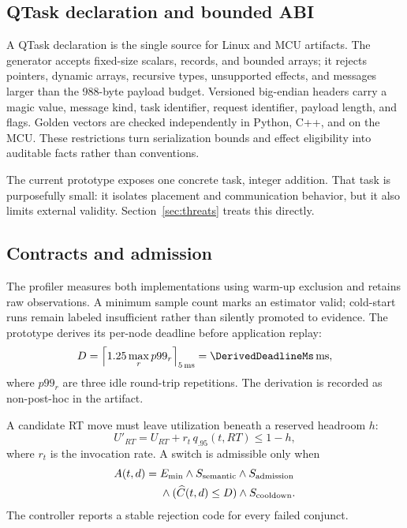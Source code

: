 \documentclass[conference]{IEEEtran}
\begin{document}
\subsection{QTask declaration and bounded ABI}
A QTask declaration is the single source for Linux and MCU artifacts. The
generator accepts fixed-size scalars, records, and bounded arrays; it rejects
pointers, dynamic arrays, recursive types, unsupported effects, and messages
larger than the 988-byte payload budget. Versioned big-endian headers carry a
magic value, message kind, task identifier, request identifier, payload length,
and flags. Golden vectors are checked independently in Python, C++, and on the
MCU. These restrictions turn serialization bounds and effect eligibility into
auditable facts rather than conventions.

The current prototype exposes one concrete task, integer addition. That task is
purposefully small: it isolates placement and communication behavior, but it
also limits external validity. Section~\ref{sec:threats} treats this directly.

\subsection{Contracts and admission}
The profiler measures both implementations using warm-up exclusion and retains
raw observations. A minimum sample count marks an estimator valid; cold-start
runs remain labeled insufficient rather than silently promoted to evidence.
The prototype derives its per-node deadline before application replay:
\begin{equation}
 D=\left\lceil 1.25\max_r p99_r\right\rceil_{5\,\mathrm{ms}}
   = \DerivedDeadlineMs\,\mathrm{ms},
 \label{eq:deadline}
\end{equation}
where $p99_r$ are three idle round-trip repetitions. The derivation is recorded
as non-post-hoc in the artifact.

A candidate RT move must leave utilization beneath a reserved headroom $h$:
\begin{equation}
 U'_{RT}=U_{RT}+r_t\,q_{.95}(t,RT)\le 1-h,
 \label{eq:admission}
\end{equation}
where $r_t$ is the invocation rate. A switch is admissible only when
\begin{align}
 A(t,d)={}&E_{\min}\land S_{\mathrm{semantic}}\land
 S_{\mathrm{admission}} \notag\\
 &\land (\widehat C(t,d)\le D)\land S_{\mathrm{cooldown}}.
 \label{eq:admissible}
\end{align}
The controller reports a stable rejection code for every failed conjunct.
\end{document}
